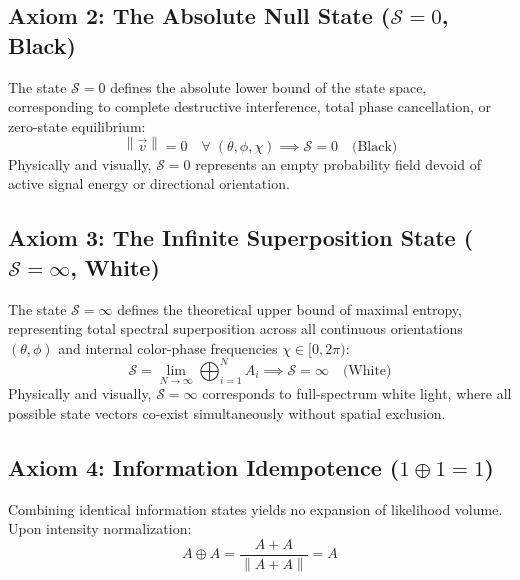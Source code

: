 \documentclass[12pt, a4paper]{article}
\providecommand{\norm}[1]{\left\lVert#1\right\rVert}
\begin{document}
\subsection{Axiom 2: The Absolute Null State ($\mathcal{S} = 0$, Black)}
\label{subsec:axiom_null}
The state $\mathcal{S} = 0$ defines the absolute lower bound of the state space, corresponding to complete destructive interference, total phase cancellation, or zero-state equilibrium:
\begin{equation}
    \norm{\vec{v}} = 0 \quad \forall \; (\theta, \phi, \chi) \implies \mathcal{S} = 0 \quad \text{(Black)}
    \label{eq:null_state}
\end{equation}
Physically and visually, $\mathcal{S} = 0$ represents an empty probability field devoid of active signal energy or directional orientation.

\subsection{Axiom 3: The Infinite Superposition State ($\mathcal{S} = \infty$, White)}
\label{subsec:axiom_infinite}
The state $\mathcal{S} = \infty$ defines the theoretical upper bound of maximal entropy, representing total spectral superposition across all continuous orientations $(\theta, \phi)$ and internal color-phase frequencies $\chi \in [0, 2\pi)$:
\begin{equation}
    \mathcal{S} = \lim_{N \to \infty} \bigoplus_{i=1}^{N} A_i \implies \mathcal{S} = \infty \quad \text{(White)}
    \label{eq:infinite_state}
\end{equation}
Physically and visually, $\mathcal{S} = \infty$ corresponds to full-spectrum white light, where all possible state vectors co-exist simultaneously without spatial exclusion.

\subsection{Axiom 4: Information Idempotence ($1 \oplus 1 = 1$)}
\label{subsec:axiom_idempotence}
Combining identical information states yields no expansion of likelihood volume. Upon intensity normalization:
\begin{equation}
    A \oplus A = \frac{A + A}{\norm{A + A}} = A
    \label{eq:idempotence_formal}
\end{equation}
\end{document}
